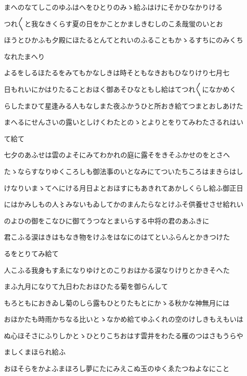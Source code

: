 \documentclass[a4paper,11pt,landscape]{ltjtarticle}
\begin{document}
\par\medskip
まへのなてしこのゆふはへをひとりのみゝ給ふはけにそかひなかりける
\par\medskip
つれ〱と我なきくらす夏の日をかことかましきむしのこゑ哉蛍のいとお
\par\medskip
ほうとひかふも夕殿にほたるとんてとれいのふることもかゝるすちにのみくち
\par\medskip
なれたまへり
\par\medskip
よるをしるほたるをみてもかなしきは時そともなきおもひなりけり七月七
\par\medskip
日もれいにかはりたることおほく御あそひなともし給はてつれ〱になかめく
\par\medskip
らしたまひて星逢みる人もなしまた夜ふかうひと所おき給てつまとおしあけた
\par\medskip
まへるにせんさいの露いとしけくわたとのゝとよりとをりてみわたさるれはい
\par\medskip
て給て
\par\medskip
七夕のあふせは雲のよそにみてわかれの庭に露そをきそふかせのをとさへ
\par\medskip
たゝならすなりゆくころしも御法事のいとなみにてついたちころはまきらはし
\par\medskip
けなりいまゝてへにける月日よとおほすにもあきれてあかしくらし給ふ御正日
\par\medskip
にはかみしもの人〻みないもゐしてかのまんたらなとけふそ供養せさせ給れい
\par\medskip
のよひの御をこなひに御てうつなとまいらする中将の君のあふきに
\par\medskip
君こふる涙はきはもなき物をけふをはなにのはてといふらんとかきつけた
\par\medskip
るをとりてみ給て
\par\medskip
人こふる我身もすゑになりゆけとのこりおほかる涙なりけりとかきそへた
\par\medskip
まふ九月になりて九日わたおほひたる菊を御らんして
\par\medskip
もろともにおきゐし菊のしら露もひとりたもとにかゝる秋かな神無月には
\par\medskip
おほかたも時雨かちなる比いとゝなかめ給てゆふくれの空のけしきもえもいは
\par\medskip
ぬ心ほそさにふりしかとゝひとりこちおはす雲井をわたる雁のつはさもうらや
\par\medskip
ましくまほられ給ふ
\par\medskip
おほそらをかよふまほろし夢にたにみえこぬ玉のゆくゑたつねよなにこと
\par\medskip
\end{document}
